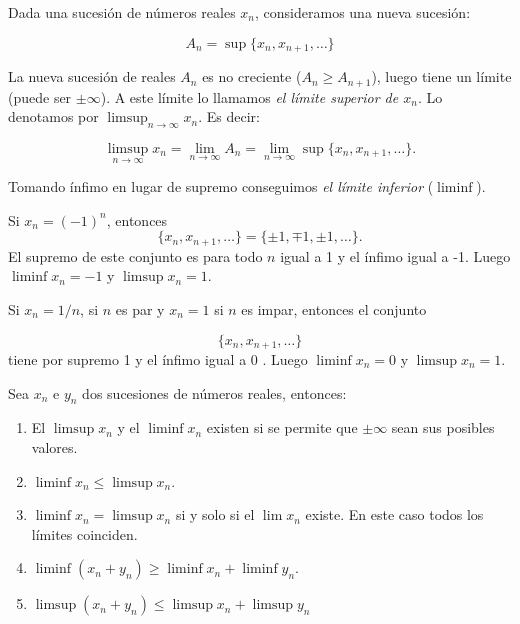 \begin{definicion}{} Dada una sucesión de números reales $x_n$,
 consideramos una nueva sucesión:

\[
	A_n=\sup\{x_n, x_{n+1},\ldots \}
\]

La nueva sucesión de reales $A_n$ es  no creciente ($A_n\geq A_{n+1}$), luego tiene un límite (puede ser $\pm\infty$). A este límite lo llamamos \emph{el límite superior de $x_n$}. Lo denotamos por $\limsup_{n\to\infty} x_n$. Es decir:


\[
\limsup_{n\to\infty} x_n=\lim_{n\to\infty} A_n=\lim\limits_{n\to \infty} \sup\{x_n, x_{n+1},\ldots \}.
\]


Tomando ínfimo en lugar de supremo conseguimos \emph{el límite inferior} ($\liminf$).
\end{definicion}
\begin{ejemplo}{}  Si $x_n=(-1)^n$, entonces
\[
	\{x_n,x_{n+1},\ldots\}=\{\pm1,\mp1,\pm1,\ldots\}.
\]
El supremo de este conjunto  es para todo $n$ igual a 1 y el ínfimo igual a -1. Luego $\liminf x_n=-1$ y $\limsup x_n=1$.
\end{ejemplo}



\begin{ejemplo}{}  Si $x_n=1/n$, si $n$ es par y $x_n=1$ si $n$ es impar, entonces el conjunto

\[
	\{x_n,x_{n+1},\ldots\}
\]
tiene por supremo 1 y el ínfimo igual a $0$ . Luego $\liminf x_n=0$ y $\limsup x_n=1$.
\end{ejemplo}

\begin{teorema}[Propiedades]{} Sea $x_n$  e $y_n$ dos sucesiones de números reales, entonces:

\begin{enumerate}
	\item El $\limsup x_n$ y el $\liminf x_n$  existen si se permite que $\pm\infty$ sean sus posibles valores.
	\item $\liminf x_n \leq \limsup x_n$.
	\item $\liminf x_n=\limsup x_n$ si y solo si el $\lim x_n$ existe. En este caso todos los límites coinciden.
	\item $\liminf (x_n+y_n)\geq \liminf x_n + \liminf y_n$.
	\item $\limsup (x_n+y_n)\leq \limsup x_n + \limsup y_n$

\end{enumerate}
\end{teorema}



